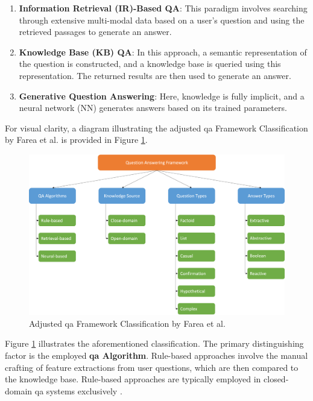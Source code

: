 \begin{enumerate}
    \item \textbf{Information Retrieval (IR)-Based QA}: This paradigm involves searching through extensive multi-modal data based on a user's question and using the retrieved passages to generate an answer.
    
    \item \textbf{Knowledge Base (KB) QA}: In this approach, a semantic representation of the question is constructed, and a knowledge base is queried using this representation. The returned results are then used to generate an answer.
    
    \item \textbf{Generative Question Answering}: Here, knowledge is fully implicit, and a neural network (NN) generates answers based on its trained parameters.

\end{enumerate}

For visual clarity, a diagram illustrating the adjusted \gls{qa} Framework Classification by Farea et al. is provided in Figure \ref{fig:qa_classification}.

\begin{figure}[H]
    \centering
    \includegraphics[width=\textwidth]{Grafiken/QA_Framework.png}
    \caption{Adjusted \gls{qa} Framework Classification by Farea et al. \cite{farea_evaluation_2022}}
    \label{fig:qa_classification}
\end{figure}


Figure \ref{fig:qa_classification} illustrates the aforementioned classification. The primary distinguishing factor is the employed \textbf{\gls{qa} Algorithm}. Rule-based approaches involve the manual crafting of feature extractions from user questions, which are then compared to the knowledge base. Rule-based approaches are typically employed in closed-domain \gls{qa} systems exclusively \cite{etezadi_state_2023}.

